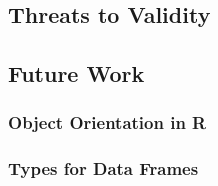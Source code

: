 \documentclass[acmsmall,review,anonymous]{acmart}\settopmatter{printfolios=true,printccs=false,printacmref=false}
\begin{document}
%
%
%
%
\subsection{Threats to Validity}

%
%
%
%
\subsection{Future Work}

%
%
\subsubsection{Object Orientation in R}

%
%
\subsubsection{Types for Data Frames}

%
%
%


\end{document}
